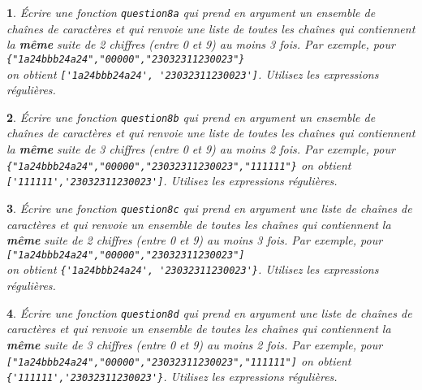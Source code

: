 \documentclass[10pt]{article}
\newtheorem{exi}{}
\newenvironment{exo}{\begin{exi}\em}{\end{exi}}
\begin{document}
\vspace*{-2ex}
\begin{exo}
    Écrire une fonction {\tt question8a} qui prend en argument un ensemble
de chaînes de caractères et qui renvoie une liste de toutes les chaînes
qui contiennent la {\bf même} suite de 2
chiffres (entre 0 et 9) au moins 3 fois.
Par exemple, pour \verb+{"1a24bbb24a24","00000","23032311230023"}+\\
on obtient \verb+['1a24bbb24a24', '23032311230023']+.
Utilisez les expressions régulières.
\end{exo}
\vspace*{-2ex}
\begin{exo}
    Écrire une fonction {\tt question8b} qui prend en argument un ensemble
de chaînes de caractères et qui renvoie une liste de toutes les chaînes
qui contiennent la {\bf même} suite de 3
chiffres (entre 0 et 9) au moins 2 fois.
Par exemple, pour \verb+{"1a24bbb24a24","00000","23032311230023","111111"}+
on obtient \verb+['111111','23032311230023']+.
Utilisez les expressions régulières.
\end{exo}
\vspace*{-2ex}
\begin{exo}
    Écrire une fonction {\tt question8c} qui prend en argument une liste
de chaînes de caractères et qui renvoie un ensemble de toutes les chaînes
qui contiennent la {\bf même} suite de 2
chiffres (entre 0 et 9) au moins 3 fois.
Par exemple, pour \verb+["1a24bbb24a24","00000","23032311230023"]+\\
on obtient \verb+{'1a24bbb24a24', '23032311230023'}+.
Utilisez les expressions régulières.
\end{exo}
\vspace*{-2ex}
\begin{exo}
    Écrire une fonction {\tt question8d} qui prend en argument une liste
de chaînes de caractères et qui renvoie un ensemble de toutes les chaînes
qui contiennent la {\bf même} suite de 3
chiffres (entre 0 et 9) au moins 2 fois.
Par exemple, pour \verb+["1a24bbb24a24","00000","23032311230023","111111"]+
on obtient \verb+{'111111','23032311230023'}+.
Utilisez les expressions régulières.
\end{exo}
\vspace*{-2ex}
\end{document}
